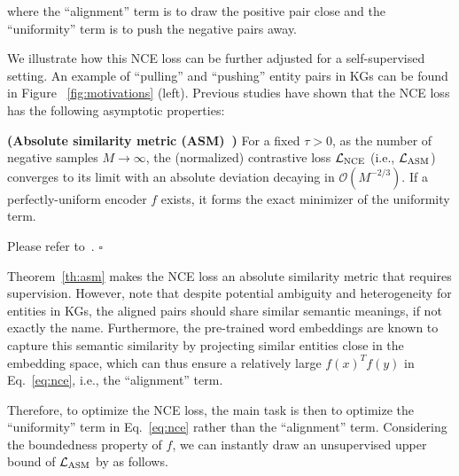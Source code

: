 \vspace{-0.2cm}
\noindent where the ``alignment'' term is to draw the positive pair close and the ``uniformity'' term is to push the negative pairs away. 

We illustrate how this NCE loss can be further adjusted for a self-supervised setting. 
An example of ``pulling'' and ``pushing'' entity pairs in KGs can be found in Figure ~\ref{fig:motivations} (left). 
Previous studies have shown that the NCE loss has the following asymptotic properties: 

\begin{theorem}{\bf (Absolute similarity metric (ASM)~\cite{wang2020understanding})} \label{th:asm}
For a fixed $\tau > 0$, as the number of negative samples $M \rightarrow \infty$, the (normalized) contrastive loss $\mathcal{L}_{\rm NCE}$ (i.e., $\mathcal{L}_{\rm ASM}$) converges to its limit with an absolute deviation decaying in $\mathcal{O}(M^{-2/3})$. If a perfectly-uniform encoder $f$ exists, it forms the exact minimizer of the uniformity term.
\end{theorem}

\vspace{-0.2cm}

\begin{pf}
    Please refer to~\cite{wang2020understanding}. \hfill$\square$
\end{pf}

Theorem~\ref{th:asm} makes the NCE loss an absolute similarity metric that requires supervision. 
However, note that despite potential ambiguity and heterogeneity for entities in KGs, the aligned pairs should share similar semantic meanings, if not exactly the name. 
Furthermore, the pre-trained word embeddings are known to capture this semantic similarity by projecting similar entities close in the embedding space, which can thus ensure a relatively large $f(x)^Tf(y)$ in Eq.~\ref{eq:nce}, i.e., the ``alignment'' term.  

Therefore, to optimize the NCE loss, the main task is then to optimize the ``uniformity'' term in Eq.~\ref{eq:nce} rather than the ``alignment'' term. 
Considering the boundedness property of $f$, we can instantly draw an unsupervised upper bound of $\mathcal{L}_{\rm ASM}$ by as follows. 


